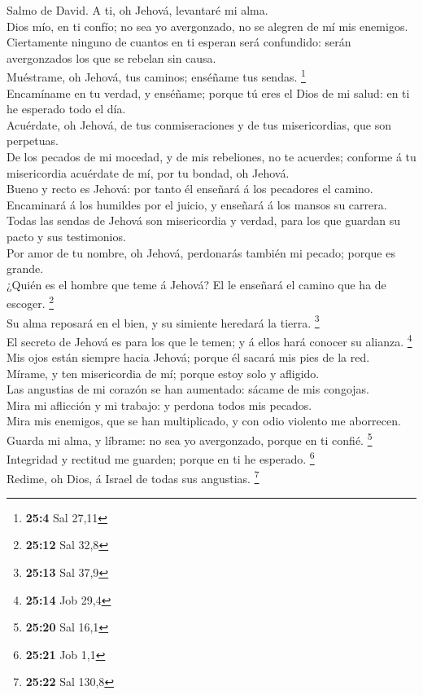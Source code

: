  Salmo de David. A ti, oh Jehová, levantaré mi alma.\\
 Dios mío, en ti confío; no sea yo avergonzado, no se
alegren de mí mis enemigos.\\
 Ciertamente ninguno de cuantos en ti esperan será
confundido: serán avergonzados los que se rebelan sin causa.\\
 Muéstrame, oh Jehová, tus caminos; enséñame tus sendas.
\footnote{\textbf{25:4} Sal 27,11}\\
 Encamíname en tu verdad, y enséñame; porque tú eres el
Dios de mi salud: en ti he esperado todo el día.\\
 Acuérdate, oh Jehová, de tus conmiseraciones y de tus
misericordias, que son perpetuas.\\
 De los pecados de mi mocedad, y de mis rebeliones, no te
acuerdes; conforme á tu misericordia acuérdate de mí, por tu bondad, oh
Jehová.\\
 Bueno y recto es Jehová: por tanto él enseñará á los
pecadores el camino.\\
 Encaminará á los humildes por el juicio, y enseñará á los
mansos su carrera.\\
 Todas las sendas de Jehová son misericordia y verdad,
para los que guardan su pacto y sus testimonios.\\
 Por amor de tu nombre, oh Jehová, perdonarás también mi
pecado; porque es grande.\\
 ¿Quién es el hombre que teme á Jehová? El le enseñará el
camino que ha de escoger. \footnote{\textbf{25:12} Sal 32,8}\\
 Su alma reposará en el bien, y su simiente heredará la
tierra. \footnote{\textbf{25:13} Sal 37,9}\\
 El secreto de Jehová es para los que le temen; y á ellos
hará conocer su alianza. \footnote{\textbf{25:14} Job 29,4}\\
 Mis ojos están siempre hacia Jehová; porque él sacará
mis pies de la red.\\
 Mírame, y ten misericordia de mí; porque estoy solo y
afligido.\\
 Las angustias de mi corazón se han aumentado: sácame de
mis congojas.\\
 Mira mi aflicción y mi trabajo: y perdona todos mis
pecados.\\
 Mira mis enemigos, que se han multiplicado, y con odio
violento me aborrecen.\\
 Guarda mi alma, y líbrame: no sea yo avergonzado, porque
en ti confié. \footnote{\textbf{25:20} Sal 16,1}\\
 Integridad y rectitud me guarden; porque en ti he
esperado. \footnote{\textbf{25:21} Job 1,1}\\
 Redime, oh Dios, á Israel de todas sus angustias.
\footnote{\textbf{25:22} Sal 130,8}


